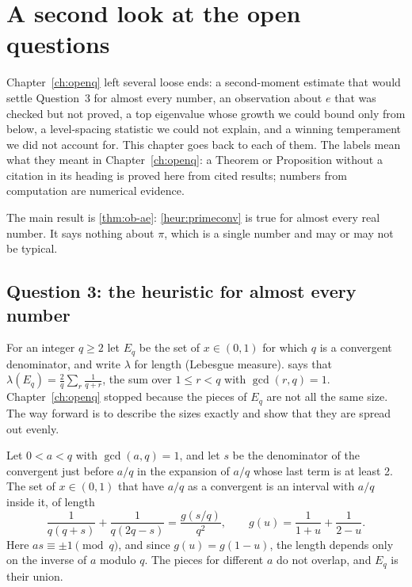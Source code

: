 \chapter{A second look at the open questions}\label{ch:openq2}
\addednote{\revB}

Chapter~\ref{ch:openq} left several loose ends: a second-moment estimate that would settle Question~3 for almost every number, an observation about $e$ that was checked but not proved, a top eigenvalue whose growth we could bound only from below, a level-spacing statistic we could not explain, and a winning temperament we did not account for. This chapter goes back to each of them. The labels mean what they meant in Chapter~\ref{ch:openq}: a Theorem or Proposition without a citation in its heading is proved here from cited results; numbers from computation are numerical evidence.

The main result is \cref{thm:ob-ae}: \cref{heur:primeconv} is true for almost every real number. It says nothing about $\pi$, which is a single number and may or may not be typical.

\section{Question 3: the heuristic for almost every number}\label{sec:ob3}

For an integer $q \ge 2$ let $E_q$ be the set of $x \in (0,1)$ for which $q$ is a convergent denominator, and write $\lambda$ for length (Lebesgue measure).  says that $\lambda(E_q) = \frac{2}{q}\sum_{r} \frac{1}{q + r}$, the sum over $1 \le r < q$ with $\gcd(r,q) = 1$. Chapter~\ref{ch:openq} stopped because the pieces of $E_q$ are not all the same size. The way forward is to describe the sizes exactly and show that they are spread out evenly.

\begin{lemma}\label{lem:ob-pieces}
Let $0 < a < q$ with $\gcd(a, q) = 1$, and let $s$ be the denominator of the convergent just before $a/q$ in the expansion of $a/q$ whose last term is at least 2. The set of $x \in (0,1)$ that have $a/q$ as a convergent is an interval with $a/q$ inside it, of length
\[
  \frac{1}{q(q+s)} + \frac{1}{q(2q - s)} = \frac{g(s/q)}{q^2}, \qquad g(u) = \frac{1}{1+u} + \frac{1}{2-u}.
\]
Here $as \equiv \pm 1 \pmod q$, and since $g(u) = g(1-u)$, the length depends only on the inverse of $a$ modulo $q$. The pieces for different $a$ do not overlap, and $E_q$ is their union.
\end{lemma}

